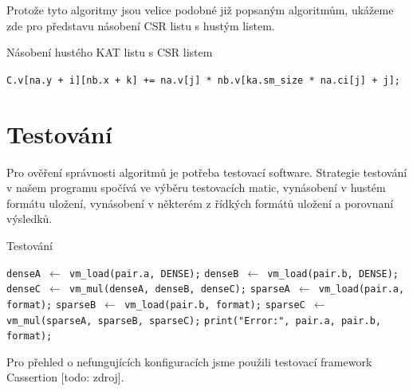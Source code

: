 Protože tyto algoritmy jsou velice podobné již popsaným algoritmům, ukážeme zde pro představu násobení CSR listu s hustým listem.

\begin{algorithm}[htb]
	\caption{Násobení hustého KAT listu s CSR listem}\label{kat-mmm-den-csr}
	\begin{algorithmic}[1]
					\State \texttt{C.v[na.y + i][nb.x + k] += na.v[j] * nb.v[ka.sm\_size * na.ci[j] + j];}
				\EndFor
			\EndFor
		\EndFor
		\EndProcedure
	\end{algorithmic}
\end{algorithm}



\section{Testování}

Pro ověření správnosti algoritmů je potřeba testovací software. Strategie testování v našem programu spočívá ve výběru testovacích matic, vynásobení v hustém formátu uložení, vynásobení v některém z řídkých formátů uložení a porovnaní výsledků.

\begin{algorithm}[htb]
	\caption{Testování}\label{testing}
	\begin{algorithmic}[1]
				\State \texttt{denseA $\gets$ vm\_load(pair.a, DENSE);}
				\State \texttt{denseB $\gets$ vm\_load(pair.b, DENSE);}
				\State \texttt{denseC $\gets$ vm\_mul(denseA, denseB, denseC);}
				\State \texttt{sparseA $\gets$ vm\_load(pair.a, format);}
				\State \texttt{sparseB $\gets$ vm\_load(pair.b, format);}
				\State \texttt{sparseC $\gets$ vm\_mul(sparseA, sparseB, sparseC);}
					\State \texttt{print("Error:", pair.a, pair.b, format);}
				\EndIf
			\EndFor
		\EndFor
		\EndProcedure
	\end{algorithmic}
\end{algorithm}

Pro přehled o nefungujících konfiguracích jsme použili testovací framework Cassertion [todo: zdroj].

